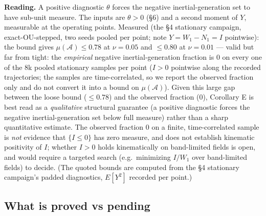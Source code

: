 \documentclass[11pt]{article}
\theoremstyle{remark}
\theoremstyle{plain}
\begin{document}
\textbf{Reading.} A positive diagnostic $\theta$ forces the negative inertial-generation set to have
sub-unit measure. The inputs
are $\theta > 0$ (\S6) and a second moment of $Y$,
measurable at the operating points. Measured
(the \S4 stationary campaign, exact-OU-stepped, two seeds pooled per point; note
$Y = W_1 - N_1 = I$ pointwise): the bound gives $\mu(\mathcal{A}) \le 0.78$ at
$\nu = 0.05$ and $\le 0.80$ at $\nu = 0.01$ --- valid but far from tight: the
\emph{empirical} negative inertial-generation fraction is $0$ on every one of the
$8$k pooled stationary samples per point ($I > 0$ pointwise along the recorded trajectories;
the samples are time-correlated, so we report the observed fraction only and do
not convert it into a bound on $\mu(\mathcal{A})$). Given this large gap between the
loose bound ($\le0.78$) and the observed fraction ($0$), Corollary E is best
read as a \emph{qualitative} structural guarantee (a positive diagnostic forces the
negative inertial-generation set below full measure) rather than a sharp quantitative estimate.
The observed fraction $0$ on a finite, time-correlated sample is \emph{not} evidence that
$\{I\le0\}$ has zero measure, and does not establish kinematic positivity of $I$; whether
$I>0$ holds kinematically on band-limited fields is open, and would require a targeted search
(e.g.\ minimizing $I/W_1$ over band-limited fields) to decide.
(The quoted bounds are computed from the \S4 stationary campaign's padded
diagnostics, $E[Y^2]$ recorded per point.)

\subsection*{What is proved vs pending}
\end{document}
